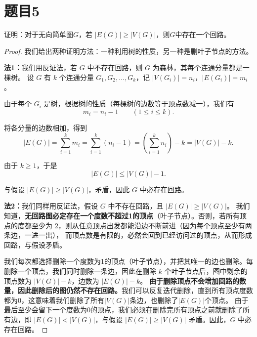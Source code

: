 \documentclass[utf8]{ctexart}
\theoremstyle{mystyle}
\begin{document}
\section*{题目5}
\begin{problembox}
证明：对于无向简单图$G$，若 $ |E(G)| \geq |V(G)| $，则$G$中存在一个回路。
\end{problembox}
\begin{proof}
我们给出两种证明方法：一种利用树的性质，另一种是删叶子节点的方法。

\textbf{法1：}我们用反证法，若 $G$ 中不存在回路，则 $G$ 为森林，其每个连通分量都是一棵树。
设 $G$ 有 $k$ 个连通分量 $G_1,G_2,\dots,G_k$，记
$|V(G_i)|=n_i$，$|E(G_i)|=m_i$。

由于每个 $G_i$ 是树，根据树的性质（每棵树的边数等于顶点数减一），我们有
\[
m_i = n_i - 1 \qquad (1\le i\le k).
\]

将各分量的边数相加，得到
\[
|E(G)|
= \sum_{i=1}^k m_i
= \sum_{i=1}^k (n_i-1)
= \left(\sum_{i=1}^k n_i\right) - k
= |V(G)| - k.
\]

由于 $k \ge 1$，于是
\[
|E(G)| \le |V(G)| - 1.
\]

与假设 $|E(G)| \ge |V(G)|$，矛盾，因此 $G$ 中必存在回路。

\textbf{法2：}我们同样用反证法，假设 $G$ 中不存在回路，且 $|E(G)| \geq |V(G)|$。
我们知道，\textbf{无回路图必定存在一个度数不超过1的顶点}（叶子节点）。否则，若所有顶点的度都至少为 $2$，则从任意顶点出发都能沿边不断前进（因为每个顶点至少有两条边，一进一出），
而顶点数是有限的，必然会回到已经访问过的顶点，从而形成回路，与假设矛盾。

我们每次都选择删除一个度数为1的顶点（叶子节点），并把其唯一的边也删除。每删除一个顶点，我们同时删除一条边，因此在删除 $k$ 个叶子节点后，图中剩余的顶点数为 $|V(G)| - k$，边数为 $|E(G)| - k$。
\textbf{由于删除顶点不会增加回路的数量，因此删除后的图仍然不存在回路。}我们可以反复迭代删除，直到所有顶点度数都为0，这意味着我们删除了所有$|V(G)|$条边，也删除了$|E(G)|$个顶点。
由于最后至少会留下一个度数为0的顶点，我们必须在删除完所有顶点之前就删除了所有边，即 $|E(G)| < |V(G)|$，与假设 $|E(G)| \geq |V(G)|$ 矛盾。因此，$G$ 中必存在回路。
\end{proof}
\end{document}
